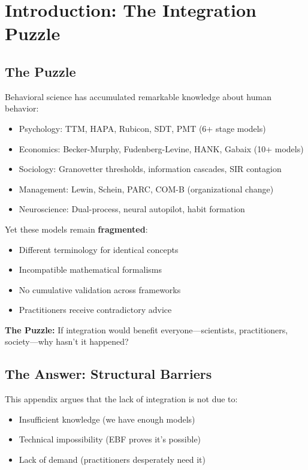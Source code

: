 \section{Introduction: The Integration Puzzle}
\label{sec:meta-intro}

\subsection{The Puzzle}

Behavioral science has accumulated remarkable knowledge about human behavior:
\begin{itemize}
\item Psychology: TTM, HAPA, Rubicon, SDT, PMT (6+ stage models)
\item Economics: Becker-Murphy, Fudenberg-Levine, HANK, Gabaix (10+ models)
\item Sociology: Granovetter thresholds, information cascades, SIR contagion
\item Management: Lewin, Schein, PARC, COM-B (organizational change)
\item Neuroscience: Dual-process, neural autopilot, habit formation
\end{itemize}

Yet these models remain \textbf{fragmented}:
\begin{itemize}
\item Different terminology for identical concepts
\item Incompatible mathematical formalisms
\item No cumulative validation across frameworks
\item Practitioners receive contradictory advice
\end{itemize}

\begin{tcolorbox}[colback=red!5!white, colframe=red!75!black]
\textbf{The Puzzle:} If integration would benefit everyone—scientists, practitioners, society—why hasn't it happened?
\end{tcolorbox}

\subsection{The Answer: Structural Barriers}

This appendix argues that the lack of integration is not due to:
\begin{itemize}
\item Insufficient knowledge (we have enough models)
\item Technical impossibility (EBF proves it's possible)
\item Lack of demand (practitioners desperately need it)
\end{itemize}

